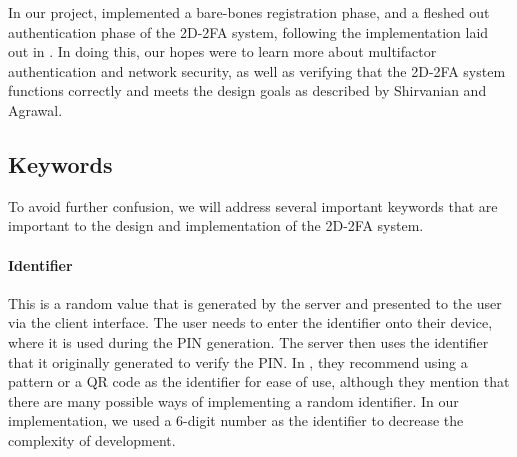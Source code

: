 \documentclass[11pt]{article} %
\begin{document}
In our project, implemented a bare-bones registration phase, and a
fleshed out authentication phase of the 2D-2FA system, following the
implementation laid out in \cite{shirvanian2d2fa}. In doing this, our
hopes were to learn more about multifactor authentication and network
security, as well as verifying that the 2D-2FA system functions
correctly and meets the design goals as described by Shirvanian and
Agrawal. 



\subsection{Keywords}

To avoid further confusion, we will address several important keywords
that are important to the design and implementation of the 2D-2FA
system. 


\paragraph{Identifier} This is a random value that is generated by the
server and presented to the user via the client interface. The user
needs to enter the identifier onto their device, where it is used during
the PIN generation. The server then uses the identifier that it
originally generated to verify the PIN. In \cite{shirvanian2d2fa}, they
recommend using a pattern or a QR code as the identifier for ease of
use, although they mention that there are many possible ways of
implementing a random identifier. In our implementation, we used a
6-digit number as the identifier to decrease the complexity of
development. 
\end{document}

